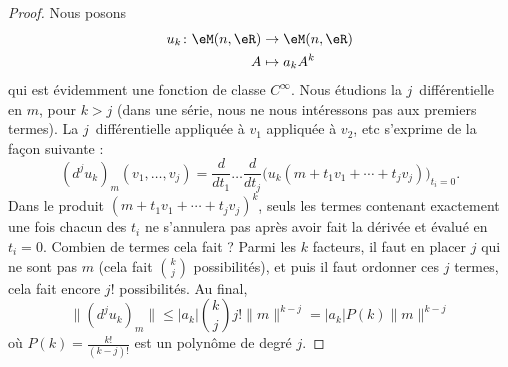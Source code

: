\begin{proof}
	Nous posons
	\begin{equation}
		\begin{aligned}
			u_k\colon \eM(n,\eR) & \to \eM(n,\eR) \\
			A                    & \mapsto a_kA^k
		\end{aligned}
	\end{equation}
	qui est évidemment une fonction de classe \(  C^{\infty}\). Nous étudions la \( j\)\ieme\ différentielle en \( m\), pour \( k>j\) (dans une série, nous ne nous intéressons pas aux premiers termes). La \( j\)\ieme\ différentielle appliquée à \( v_1\) appliquée à \( v_2\), etc s'exprime de la façon suivante :
	\begin{equation}
		(d^ju_k)_m(v_1,\ldots, v_j)=\frac{ d  }{ d t_1 }\ldots\frac{ d  }{ d t_j }\Big( u_k(m+t_1v_1+\cdots +t_jv_j)    \Big)_{t_i=0}.
	\end{equation}
	Dans le produit \( (m+t_1v_1+\cdots +t_jv_j)^k\), seuls les termes contenant exactement une fois chacun des \( t_i\) ne s'annulera pas après avoir fait la dérivée et évalué en \( t_i=0\). Combien de termes cela fait ? Parmi les \( k\) facteurs, il faut en placer \( j\) qui ne sont pas \( m\) (cela fait \( \binom{ k }{ j }\) possibilités), et puis il faut ordonner ces \( j\) termes, cela fait encore \( j!\) possibilités. Au final,
	\begin{equation}
		\| (d^ju_k)_m \|\leq | a_k | \binom{ k }{ j }j!\| m \|^{k-j}=| a_k |P(k)\| m \|^{k-j}
	\end{equation}
	où \( P(k)=\frac{ k! }{ (k-j)! }\) est un polynôme de degré \( j\).


\end{proof}

